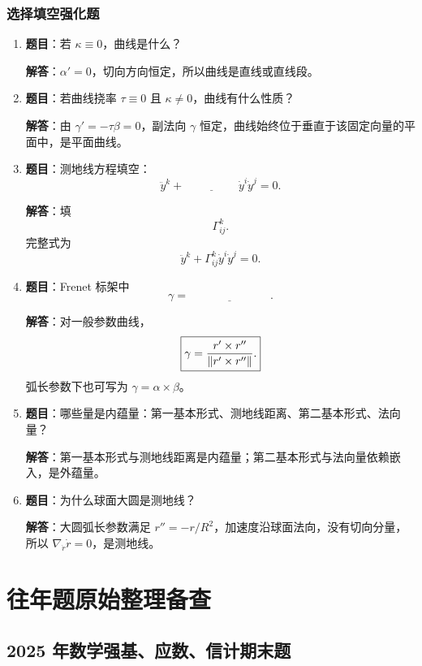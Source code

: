 \documentclass[UTF8,12pt,a4paper]{ctexart}
\newcommand{\norm}[1]{\left\lVert #1\right\rVert}
\begin{document}
\subsubsection{选择填空强化题}
\begin{enumerate}
\item \textbf{题目}：若 $\kappa\equiv0$，曲线是什么？

\textbf{解答}：$\alpha'=0$，切向方向恒定，所以曲线是直线或直线段。

\item \textbf{题目}：若曲线挠率 $\tau\equiv0$ 且 $\kappa\ne0$，曲线有什么性质？

\textbf{解答}：由 $\gamma'=-\tau\beta=0$，副法向 $\gamma$ 恒定，曲线始终位于垂直于该固定向量的平面中，是平面曲线。

\item \textbf{题目}：测地线方程填空：
\[
\ddot y^k+\underline{\hspace{2cm}}\dot y^i\dot y^j=0.
\]

\textbf{解答}：填
\[
\boxed{\Gamma^k_{ij}}.
\]
完整式为
\[
\ddot y^k+\Gamma^k_{ij}\dot y^i\dot y^j=0.
\]

\item \textbf{题目}：Frenet 标架中
\[
\gamma=\underline{\hspace{3cm}}.
\]

\textbf{解答}：对一般参数曲线，
\[
\boxed{\gamma={r'\times r''\over\norm{r'\times r''}}.}
\]
弧长参数下也可写为 $\gamma=\alpha\times\beta$。

\item \textbf{题目}：哪些量是内蕴量：第一基本形式、测地线距离、第二基本形式、法向量？

\textbf{解答}：第一基本形式与测地线距离是内蕴量；第二基本形式与法向量依赖嵌入，是外蕴量。

\item \textbf{题目}：为什么球面大圆是测地线？

\textbf{解答}：大圆弧长参数满足 $r''=-r/R^2$，加速度沿球面法向，没有切向分量，所以 $\nabla_{\dot r}\dot r=0$，是测地线。
\end{enumerate}

\iffalse
\section{往年题原始整理备查}

\subsection{2025 年数学强基、应数、信计期末题}
\end{document}
